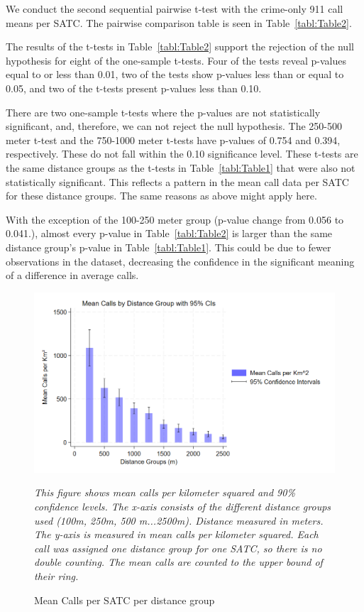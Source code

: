 \documentclass[12pt]{article}
\begin{document}
We conduct the second sequential pairwise t-test with the crime-only 911 call means per SATC. The pairwise comparison table is seen in Table~\ref{tabl:Table2}. 

The results of the t-tests in Table~\ref{tabl:Table2} support the rejection of the null hypothesis for eight of the one-sample t-tests. Four of the tests reveal p-values equal to or less than 0.01, two of the tests show p-values less than or equal to 0.05, and two of the t-tests present p-values less than 0.10. 

There are two one-sample t-tests where the p-values are not statistically significant, and, therefore, we can not reject the null hypothesis. The 250-500 meter t-test and the 750-1000 meter t-tests have p-values of 0.754 and 0.394, respectively. These do not fall within the 0.10 significance level. These t-tests are the same distance groups as the t-tests in Table~\ref{tabl:Table1} that were also not statistically significant. This reflects a pattern in the mean call data per SATC for these distance groups. The same reasons as above might apply here.

With the exception of the 100-250 meter group (p-value change from 0.056 to 0.041.), almost every p-value in Table~\ref{tabl:Table2} is larger than the same distance group's p-value in Table~\ref{tabl:Table1}. This could be due to fewer observations in the dataset, decreasing the confidence in the significant meaning of a difference in average calls. 

\begin{figure}[htbp]
    \centering
\includegraphics[width=0.75\linewidth]{Reproducibility Package/Downloaded_calls/Visual_Graphics_Downloaded_calls/250_CI_Graph.png}
    \caption{Mean Calls per SATC per distance group}
     \label{fig:Figure3}
     \textit{This figure shows mean calls per kilometer squared and 90\% confidence levels. The x-axis consists of the different distance groups used (100m, 250m, 500 m...2500m). Distance measured in meters.}
    \textit{The y-axis is measured in mean calls per kilometer squared. Each call was assigned one distance group for one SATC, so there is no double counting. The mean calls are counted to the upper bound of their ring.}
    \textit{}
\end{figure}
\end{document}
